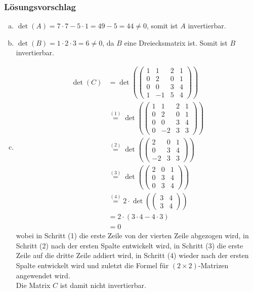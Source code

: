 \documentclass[a4paper,11pt]{scrartcl}
\newcounter{auf}
\begin{document}
\subsubsection*{Lösungsvorschlag}
\begin{enumerate}[a)]
\item $\det(A)=7\cdot 7 - 5 \cdot 1 =49-5=44 \ne 0$, somit ist $A$ invertierbar.
\item $\det(B)=1\cdot 2 \cdot 3=6 \ne 0$, da $B$ eine Dreiecksmatrix ist. Somit ist $B$ invertierbar.
\item \begin{align*}
\det(C)&=\det(\begin{pmatrix} 1 & 1 &  2 & 1 \\ 0 & 2 & 0 & 1 \\ 0 & 0& 3 & 4 \\ 1 & -1 & 5 & 4 \end{pmatrix})\\
&\stackrel{(1)}{=}\det(\begin{pmatrix} 1 & 1 &  2 & 1 \\ 0 & 2 & 0 & 1 \\ 0 & 0& 3 & 4 \\ 0 & -2 & 3 & 3 \end{pmatrix})\\
&\stackrel{(2)}{=}\det(\begin{pmatrix}  2 & 0 & 1 \\  0& 3 & 4 \\  -2 & 3 & 3 \end{pmatrix})\\
&\stackrel{(3)}{=}\det(\begin{pmatrix}  2 & 0 & 1 \\  0& 3 & 4 \\  0 & 3 & 4 \end{pmatrix})\\
&\stackrel{(4)}{=}2\cdot \det(\begin{pmatrix}     3 & 4 \\   3 & 4 \end{pmatrix})\\
&=2\cdot (3 \cdot 4 - 4 \cdot 3)\\
&=0
\end{align*}
wobei in Schritt (1) die erste Zeile von der vierten Zeile abgezogen wird, in Schritt (2) nach der ersten Spalte entwickelt wird, in Schritt (3) die erste Zeile auf die dritte Zeile addiert wird, in Schritt (4) wieder nach der ersten Spalte entwickelt wird und zuletzt die Formel für $(2\times2)$-Matrizen angewendet wird.\\
Die Matrix $C$ ist damit nicht invertierbar.
\end{enumerate}
\end{document}
